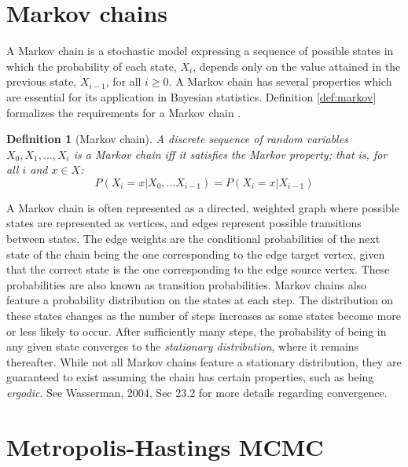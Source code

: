 \documentclass[
  12pt,
  oneside]{book}
\theoremstyle{definition}
\newtheorem{definition}{Definition}[chapter]
\theoremstyle{definition}
\theoremstyle{definition}
\theoremstyle{remark}
\begin{document}
\hypertarget{markov-chains}{%
\section{Markov chains}\label{markov-chains}}

A Markov chain is a stochastic model expressing a sequence of possible states in which the probability of each state, \(X_{i}\), depends only on the value attained in the previous state, \(X_{i-1}\), for all \(i \geq 0\).
A Markov chain has several properties which are essential for its application in Bayesian statistics.
Definition \ref{def:markov} formalizes the requirements for a Markov chain \citep[  23.2]{Wasserman2004}.

\begin{definition}[Markov chain]
\protect\hypertarget{def:markov}{}{\label{def:markov} {} }\emph{A discrete sequence of random variables \({X_{0},X_{1},...,X_{i}}\) is a Markov chain iff it satisfies the Markov property; that is, for all \(i\) and \(x \in X\):}
\[P(X_{i}=x|X_{0},...X_{i-1})=P(X_{i}=x|X_{i-1})\]
\end{definition}

A Markov chain is often represented as a directed, weighted graph where possible states are represented as vertices, and edges represent possible transitions between states. The edge weights are the conditional probabilities of the next state of the chain being the one corresponding to the edge target vertex, given that the correct state is the one corresponding to the edge source vertex.
These probabilities are also known as transition probabilities.
Markov chains also feature a probability distribution on the states at each step.
The distribution on these states changes as the number of steps increases as some states become more or less likely to occur.
After sufficiently many steps, the probability of being in any given state converges to the \emph{stationary distribution}, where it remains thereafter.
While not all Markov chains feature a stationary distribution, they are guaranteed to exist assuming the chain has certain properties, such as being \emph{ergodic}.
See Wasserman, 2004, Sec 23.2 for more details regarding convergence.

\hypertarget{metropolis-hastings-mcmc}{%
\section{Metropolis-Hastings MCMC}\label{metropolis-hastings-mcmc}}
\end{document}

